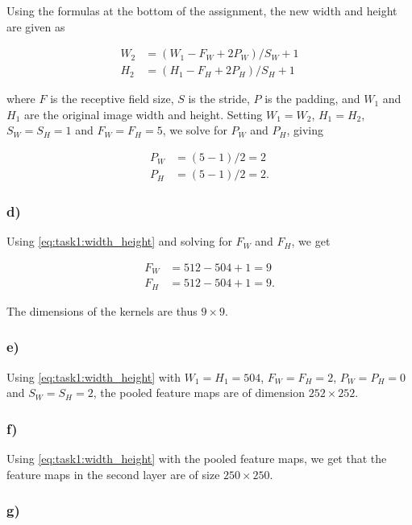 Using the formulas at the bottom of the assignment, the new width and height are given as

\begin{subequations}
  \begin{align}
    W_2 &= (W_1 - F_W + 2P_W)/S_W + 1 \\
    H_2 &= (H_1 - F_H + 2P_H)/S_H + 1
  \end{align}
  \label{eq:task1:width_height}
\end{subequations}


where $F$ is the receptive field size, $S$ is the stride, $P$ is the padding, and $W_1$ and $H_1$ are the original image width and height. Setting $W_1=W_2$, $H_1=H_2$, $S_W=S_H=1$ and $F_W=F_H=5$, we solve for $P_W$ and $P_H$, giving

\begin{align*}
  P_W &= (5 -1) / 2 = 2 \\
  P_H &= (5 -1) / 2 = 2.
\end{align*}

\subsubsection*{d)}

Using \cref{eq:task1:width_height} and solving for $F_W$ and $F_H$, we get

\begin{align*}
  F_W &= 512 - 504 + 1 = 9 \\
  F_H &= 512 - 504 + 1 = 9.
\end{align*}

The dimensions of the kernels are thus $9 \times 9$.

\subsubsection*{e)}

Using \cref{eq:task1:width_height} with $W_1=H_1=504$, $F_W=F_H=2$, $P_W=P_H=0$ and $S_W=S_H=2$, the pooled feature maps are of dimension $252\times 252$.

\subsubsection*{f)}

Using \cref{eq:task1:width_height} with the pooled feature maps, we get that the feature maps in the second layer are of size $250 \times 250$.

\subsubsection*{g)}

